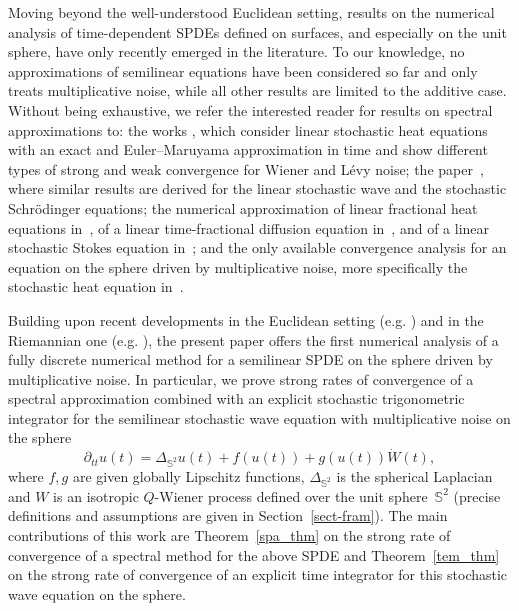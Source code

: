 \documentclass[a4paper]{amsart}
\theoremstyle{remark}
\theoremstyle{definition}
\newcommand{\IS}{\mathbb{S}}
\begin{document}
Moving beyond the well-understood Euclidean setting, results on the numerical analysis of time-dependent SPDEs defined on surfaces, and especially on the unit sphere, have only recently emerged in the literature. To our knowledge, no approximations of semilinear equations have been considered so far and only \cite{MR3907363} treats multiplicative noise, while all other results are limited to the additive case. Without being exhaustive, we refer the interested reader for results on spectral approximations to: 
the works \cite{MR3404631, MR4701212, lang2025approximationlevydrivenstochasticheat}, which consider linear stochastic heat equations with an exact and Euler--Maruyama approximation in time and show different types of strong and weak convergence for Wiener and L\'evy noise;
the paper~\cite{MR4462619}, where similar results are derived for the linear stochastic wave and the stochastic Schr\"odinger equations;
the numerical approximation of linear fractional heat equations in~\cite{123456}, of a linear time-fractional diffusion equation in~\cite{MR4714764}, and of a linear stochastic Stokes equation in~\cite{LeGia2019};
and the only available convergence analysis for an equation on the sphere driven by multiplicative noise, more specifically the stochastic heat equation in~\cite{MR3907363}.

Building upon recent developments in the Euclidean setting (e.g. \cite{MR3353942,MR3484400}) and in the Riemannian one (e.g. \cite{MR4462619}), the present paper offers the first numerical analysis of a fully discrete numerical method for a semilinear SPDE on the sphere driven by multiplicative noise. In particular, we prove strong rates of convergence of a spectral approximation combined with an explicit stochastic trigonometric integrator for the semilinear stochastic wave equation with multiplicative noise on the sphere
\begin{equation*}
\partial_{tt}{u}(t)=\Delta_{\mathbb{S}^2}u(t)+f(u(t))+g(u(t))\dot{W}(t),
\end{equation*}
where $f,g$ are given globally Lipschitz functions, $\Delta_{\IS^2}$ is the spherical Laplacian and $W$ is an isotropic $Q$-Wiener process defined over the unit sphere~$\IS^2$ (precise definitions and assumptions are given in Section~\ref{sect-fram}). The main contributions of this work are Theorem~\ref{spa_thm} on the strong rate of convergence of a spectral method for the above SPDE and Theorem~\ref{tem_thm} on the strong rate of convergence of an explicit time integrator for this stochastic wave equation on the sphere. 
\end{document}
